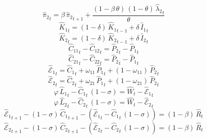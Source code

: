 \begin{dmath}
{{\hat{\pi}_{2}}}_{t}={{\beta}}\, {{\hat{\pi}_{2}}}_{t+1}+\frac{\left(1-{{\beta}}\, {{\theta}}\right)\, \left(1-{{\theta}}\right)\, {{\hat{\lambda}_{2}}}_{t}}{{{\theta}}}
\end{dmath}
\begin{dmath}
{{\hat{K}_{1}}}_{t}=\left(1-{{\delta}}\right)\, {{\hat{K}_{1}}}_{t-1}+{{\delta}}\, {{\hat{I}_{1}}}_{t}
\end{dmath}
\begin{dmath}
{{\hat{K}_{2}}}_{t}=\left(1-{{\delta}}\right)\, {{\hat{K}_{2}}}_{t-1}+{{\delta}}\, {{\hat{I}_{2}}}_{t}
\end{dmath}
\begin{dmath}
{{\hat{C}_{1 1}}}_{t}-{{\hat{C}_{1 2}}}_{t}={{\hat{P}_{2}}}_{t}-{{\hat{P}_{1}}}_{t}
\end{dmath}
\begin{dmath}
{{\hat{C}_{2 1}}}_{t}-{{\hat{C}_{2 2}}}_{t}={{\hat{P}_{2}}}_{t}-{{\hat{P}_{1}}}_{t}
\end{dmath}
\begin{dmath}
{{\hat{\mathscr{E}}_{1}}}_{t}={{\hat{C}_{1}}}_{t}+{{\omega_{11}}}\, {{\hat{P}_{1}}}_{t}+\left(1-{{\omega_{11}}}\right)\, {{\hat{P}_{2}}}_{t}
\end{dmath}
\begin{dmath}
{{\hat{\mathscr{E}}_{2}}}_{t}={{\hat{C}_{2}}}_{t}+{{\omega_{21}}}\, {{\hat{P}_{1}}}_{t}+\left(1-{{\omega_{21}}}\right)\, {{\hat{P}_{2}}}_{t}
\end{dmath}
\begin{dmath}
{{\varphi}}\, {{\hat{L}_{1}}}_{t}-{{\hat{C}_{1}}}_{t}\, \left(1-{{\sigma}}\right)={{\hat{W}}}_{t}-{{\hat{\mathscr{E}}_{1}}}_{t}
\end{dmath}
\begin{dmath}
{{\varphi}}\, {{\hat{L}_{2}}}_{t}-{{\hat{C}_{2}}}_{t}\, \left(1-{{\sigma}}\right)={{\hat{W}}}_{t}-{{\hat{\mathscr{E}}_{2}}}_{t}
\end{dmath}
\begin{dmath}
{{\hat{\mathscr{E}}_{1}}}_{t+1}-\left(1-{{\sigma}}\right)\, {{\hat{C}_{1}}}_{t+1}-\left({{\hat{\mathscr{E}}_{1}}}_{t}-{{\hat{C}_{1}}}_{t}\, \left(1-{{\sigma}}\right)\right)=\left(1-{{\beta}}\right)\, {{\hat{R}}}_{t}
\end{dmath}
\begin{dmath}
{{\hat{\mathscr{E}}_{2}}}_{t+1}-\left(1-{{\sigma}}\right)\, {{\hat{C}_{2}}}_{t+1}-\left({{\hat{\mathscr{E}}_{2}}}_{t}-{{\hat{C}_{2}}}_{t}\, \left(1-{{\sigma}}\right)\right)=\left(1-{{\beta}}\right)\, {{\hat{R}}}_{t}
\end{dmath}
